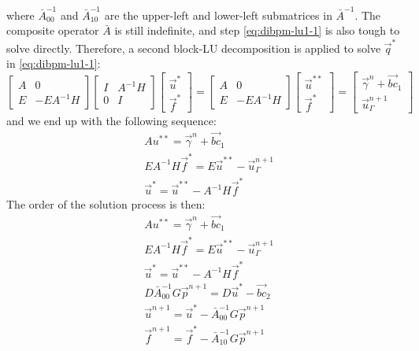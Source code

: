 where $\bar{A}_{00}^{-1}$ and $\bar{A}_{10}^{-1}$ are the upper-left and lower-left submatrices in $\bar{A}^{-1}$.
The composite operator $\bar{A}$ is still indefinite, and step \eqref{eq:dibpm-lu1-1} is also tough to solve directly.
Therefore, a second block-LU decomposition is applied to solve $\vec{q}^{*}$ in \eqref{eq:dibpm-lu1-1}:
\begin{equation}
    \begin{bmatrix}
        A & 0 \\
        E & -EA^{-1}H
    \end{bmatrix}
    \begin{bmatrix}
        I & A^{-1}H \\
        0 & I
    \end{bmatrix}
    \begin{bmatrix}
        \vec{u}^* \\
        \vec{f}^*
    \end{bmatrix}
    =
    \begin{bmatrix}
        A & 0 \\
        E & -EA^{-1}H
    \end{bmatrix}
    \begin{bmatrix}
        \vec{u}^{* *} \\
        \vec{f}^*
    \end{bmatrix}
    =
    \begin{bmatrix}
        \vec{\gamma}^n + \vec{bc}_1 \\
        \vec{u}_\Gamma^{n+1}
    \end{bmatrix}
\end{equation}
and we end up with the following sequence:
\begin{subequations}
    \begin{align}
        & A u^{* *} = \vec{\gamma}^n + \vec{bc}_1\label{eq:dibpm-lu2-1} \\
        & EA^{-1}H \vec{f}^* = E \vec{u}^{* *} - \vec{u}_\Gamma^{n+1}\label{eq:dibpm-lu2-2} \\
        & \vec{u}^* = \vec{u}^{* *} - A^{-1}H \vec{f}^*\label{eq:dibpm-lu2-3}
    \end{align}
\end{subequations}
The order of the solution process is then:
\begin{subequations}
    \begin{align}
        & A u^{* *} = \vec{\gamma}^n + \vec{bc}_1\label{eq:dibpm-order1-1} \\
        & EA^{-1}H \vec{f}^* = E \vec{u}^{* *} - \vec{u}_\Gamma^{n+1}\label{eq:dibpm-order1-2} \\
        & \vec{u}^* = \vec{u}^{* *} - A^{-1}H \vec{f}^*\label{eq:dibpm-order1-3}\\
        & D\bar{A}_{00}^{-1}G \vec{p}^{n+1} = D \vec{u}^* - \vec{bc}_2\label{eq:dibpm-order1-4} \\
        & \vec{u}^{n+1} = \vec{u}^* - \bar{A}_{00}^{-1}G \vec{p}^{n+1}\label{eq:dibpm-order1-5} \\
        & \vec{f}^{n+1} = \vec{f}^* - \bar{A}_{10}^{-1}G \vec{p}^{n+1}\label{eq:dibpm-order1-6}
    \end{align}
\end{subequations}

